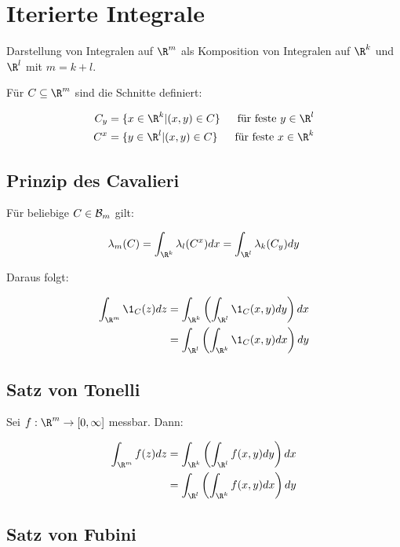 \section*{Iterierte Integrale}

Darstellung von Integralen auf $\R^m$ als Komposition von Integralen auf $\R^k$ und $\R^l$ mit $m = k + l$.

Für $C \subseteq \R^m$ sind die Schnitte definiert:

\vspace{-4mm}
\begin{align*}
	C_y &= \{ x \in \R^k | (x,y) \in C \} &\text{ für feste } y \in \R^l\\
	C^x &= \{ y \in \R^l | (x,y) \in C \} &\text{ für feste } x \in \R^k
\end{align*}

\subsection*{Prinzip des Cavalieri}

Für beliebige $C \in \mathcal{B}_m$ gilt:

$$\lambda_m(C) = \int_{\R^k} \lambda_l(C^x) dx = \int_{\R^l} \lambda_k(C_y) dy$$

Daraus folgt:

\vspace{-4mm}
\begin{align*}
\int_{\R^m} \1_C(z) dz &= \int_{\R^k} \left( \int_{\R^l} \1_C(x,y) dy \right) dx\\
                         &= \int_{\R^l} \left( \int_{\R^k} \1_C(x,y) dx \right) dy
\end{align*}

\subsection*{Satz von Tonelli}

Sei $f : \R^m \to [0,\infty]$ messbar. Dann:

\vspace{-4mm}
\begin{align*}
	\int_{\R^m} f(z) dz &= \int_{\R^k} \left( \int_{\R^l} f(x,y) dy \right) dx\\
	             &= \int_{\R^l} \left( \int_{\R^k} f(x,y) dx \right) dy
\end{align*}

\subsection*{Satz von Fubini}


